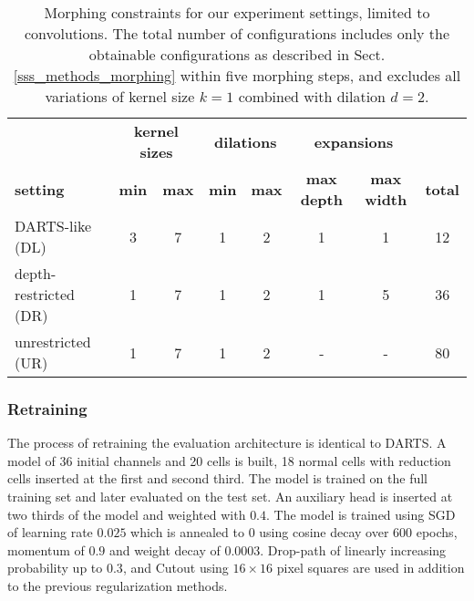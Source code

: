 \documentclass[conference]{IEEEtran}
\begin{document}
\begin{table*}[htbp]
	\caption{Morphing constraints for our experiment settings, limited to convolutions. The total number of configurations includes only the obtainable configurations as described in Sect. \ref{sss_methods_morphing} within five morphing steps, and excludes all variations of kernel size $k=1$ combined with dilation $d=2$.}
	\centering
	\begin{center}
		\begin{tabular}{ l  c c  c c  c c  c }
			\toprule
			& \multicolumn{2}{c}{\textbf{kernel sizes}} & \multicolumn{2}{c}{\textbf{dilations}} & 
			\multicolumn{2}{c}{\textbf{expansions}} & \\
			\cmidrule(r){2-3}
			\cmidrule(r){4-5}
			\cmidrule(r){6-7}
			\textbf{\textbf{setting}} & \textbf{min} & \textbf{max} & \textbf{min} & \textbf{max} & \textbf{max depth} & \textbf{max width} & \textbf{total} \\
			\midrule
			DARTS-like (DL)			& 3  & 7  & 1  & 2  & 1  & 1 & 12 \\
			depth-restricted (DR)	& 1  & 7  & 1  & 2  & 1  & 5 & 36 \\
			unrestricted (UR)		& 1  & 7  & 1  & 2  & -  & - & 80 \\
			\bottomrule
		\end{tabular}
		\label{tab_constraints}
	\end{center}
\end{table*}


\subsubsection*{Retraining}

The process of retraining the evaluation architecture is identical to DARTS. A model of 36 initial channels and 20 cells is built, 18 normal cells with reduction cells inserted at the first and second third. The model is trained on the full training set and later evaluated on the test set.
An auxiliary head is inserted at two thirds of the model and weighted with $0.4$. The model is trained using SGD of learning rate $0.025$ which is annealed to $0$ using cosine decay over 600 epochs, momentum of $0.9$ and weight decay of $0.0003$.
Drop-path \cite{etc_droppath} of linearly increasing probability up to $0.3$, and Cutout \cite{etc_cutout} using $16 \times 16$ pixel squares are used in addition to the previous regularization methods.
\end{document}
